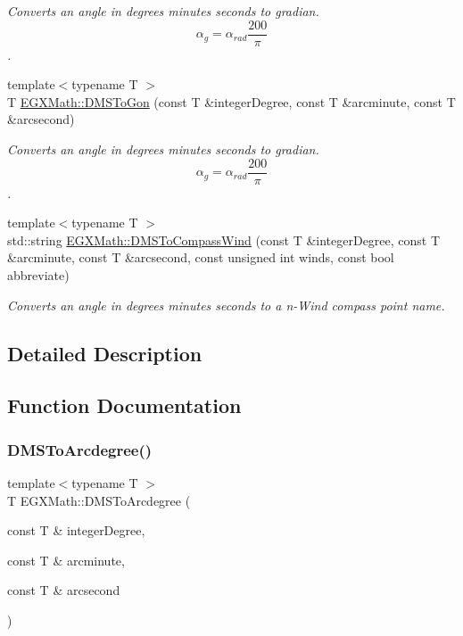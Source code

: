 \begin{DoxyCompactItemize}
\begin{DoxyCompactList}\small\item\em Converts an angle in degrees minutes seconds to gradian. \[\alpha_{g}=\alpha_{rad}\frac{200}{\pi}\]. \end{DoxyCompactList}\item 
{\footnotesize template$<$typename T $>$ }\\T \mbox{\hyperlink{group___e_g_x_math-_angle_conversions-_d_m_s_ga47fe1b9127ec6b73ee759eef038a8eb6}{E\+G\+X\+Math\+::\+D\+M\+S\+To\+Gon}} (const T \&integer\+Degree, const T \&arcminute, const T \&arcsecond)
\begin{DoxyCompactList}\small\item\em Converts an angle in degrees minutes seconds to gradian. \[\alpha_{g}=\alpha_{rad}\frac{200}{\pi}\]. \end{DoxyCompactList}\item 
{\footnotesize template$<$typename T $>$ }\\std\+::string \mbox{\hyperlink{group___e_g_x_math-_angle_conversions-_d_m_s_ga3beb450aec060ec6d4f0abae7eb7e503}{E\+G\+X\+Math\+::\+D\+M\+S\+To\+Compass\+Wind}} (const T \&integer\+Degree, const T \&arcminute, const T \&arcsecond, const unsigned int winds, const bool abbreviate)
\begin{DoxyCompactList}\small\item\em Converts an angle in degrees minutes seconds to a n-\/\+Wind compass point name. \end{DoxyCompactList}\end{DoxyCompactItemize}


\subsection{Detailed Description}


\subsection{Function Documentation}
\mbox{\label{group___e_g_x_math-_angle_conversions-_d_m_s_ga641f46ead1a3f19312aab422e569b810}} 
\subsubsection{\texorpdfstring{D\+M\+S\+To\+Arcdegree()}{DMSToArcdegree()}}
{\footnotesize\ttfamily template$<$typename T $>$ \\
T E\+G\+X\+Math\+::\+D\+M\+S\+To\+Arcdegree (\begin{DoxyParamCaption}\item[{const T \&}]{integer\+Degree,  }\item[{const T \&}]{arcminute,  }\item[{const T \&}]{arcsecond }\end{DoxyParamCaption})}



